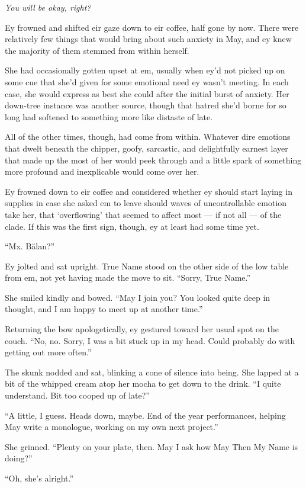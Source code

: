 \emph{You will be okay, right?}

Ey frowned and shifted eir gaze down to eir coffee, half gone by now. There were relatively few things that would bring about such anxiety in May, and ey knew the majority of them stemmed from within herself.

She had occasionally gotten upset at em, usually when ey'd not picked up on some cue that she'd given for some emotional need ey wasn't meeting. In each case, she would express as best she could after the initial burst of anxiety. Her down-tree instance was another source, though that hatred she'd borne for so long had softened to something more like distaste of late.

All of the other times, though, had come from within. Whatever dire emotions that dwelt beneath the chipper, goofy, sarcastic, and delightfully earnest layer that made up the most of her would peek through and a little spark of something more profound and inexplicable would come over her.

Ey frowned down to eir coffee and considered whether ey should start laying in supplies in case she asked em to leave should waves of uncontrollable emotion take her, that `overflowing' that seemed to affect most — if not all — of the clade. If this was the first sign, though, ey at least had some time yet.

``Mx. Bălan?''

Ey jolted and sat upright. True Name stood on the other side of the low table from em, not yet having made the move to sit. ``Sorry, True Name.''

She smiled kindly and bowed. ``May I join you? You looked quite deep in thought, and I am happy to meet up at another time.''

Returning the bow apologetically, ey gestured toward her usual spot on the couch. ``No, no. Sorry, I was a bit stuck up in my head. Could probably do with getting out more often.''

The skunk nodded and sat, blinking a cone of silence into being. She lapped at a bit of the whipped cream atop her mocha to get down to the drink. ``I quite understand. Bit too cooped up of late?''

``A little, I guess. Heads down, maybe. End of the year performances, helping May write a monologue, working on my own next project.''

She grinned. ``Plenty on your plate, then. May I ask how May Then My Name is doing?''

``Oh, she's alright.''


